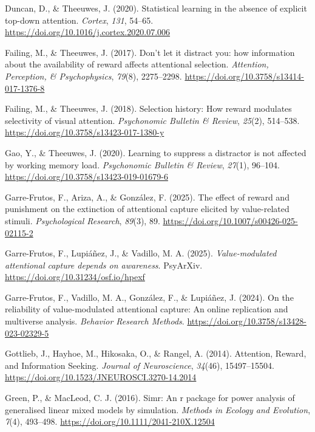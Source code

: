 \documentclass[
  man,
  floatsintext,
  longtable,
  nolmodern,
  notxfonts,
  notimes,
  colorlinks=true,linkcolor=blue,citecolor=blue,urlcolor=blue]{apa7}
\newlength{\cslhangindent}
\newenvironment{CSLReferences}[2] %
 {\begin{list}{}{%
  \setlength{\itemindent}{0pt}
  \setlength{\leftmargin}{0pt}
  \setlength{\parsep}{0pt}
  \ifodd #1
   \setlength{\leftmargin}{\cslhangindent}
   \setlength{\itemindent}{-1\cslhangindent}
  \fi
  \setlength{\itemsep}{#2\baselineskip}}}
 {\end{list}}
\begin{document}
\begin{CSLReferences}{1}{0}
Duncan, D., \& Theeuwes, J. (2020). Statistical learning in the absence
of explicit top-down attention. \emph{Cortex}, \emph{131}, 54--65.
\url{https://doi.org/10.1016/j.cortex.2020.07.006}

Failing, M., \& Theeuwes, J. (2017). Don{'}t let it distract you: how
information about the availability of reward affects attentional
selection. \emph{Attention, Perception, \& Psychophysics}, \emph{79}(8),
2275--2298. \url{https://doi.org/10.3758/s13414-017-1376-8}

Failing, M., \& Theeuwes, J. (2018). Selection history: How reward
modulates selectivity of visual attention. \emph{Psychonomic Bulletin \&
Review}, \emph{25}(2), 514--538.
\url{https://doi.org/10.3758/s13423-017-1380-y}

Gao, Y., \& Theeuwes, J. (2020). Learning to suppress a distractor is
not affected by working memory load. \emph{Psychonomic Bulletin \&
Review}, \emph{27}(1), 96--104.
\url{https://doi.org/10.3758/s13423-019-01679-6}

Garre-Frutos, F., Ariza, A., \& González, F. (2025). The effect of
reward and punishment on the extinction of attentional capture elicited
by value-related stimuli. \emph{Psychological Research}, \emph{89}(3),
89. \url{https://doi.org/10.1007/s00426-025-02115-2}

Garre-Frutos, F., Lupiáñez, J., \& Vadillo, M. A. (2025).
\emph{Value-modulated attentional capture depends on awareness}.
PsyArXiv. \url{https://doi.org/10.31234/osf.io/hpexf}

Garre-Frutos, F., Vadillo, M. A., González, F., \& Lupiáñez, J. (2024).
On the reliability of value-modulated attentional capture: An online
replication and multiverse analysis. \emph{Behavior Research Methods}.
\url{https://doi.org/10.3758/s13428-023-02329-5}

Gottlieb, J., Hayhoe, M., Hikosaka, O., \& Rangel, A. (2014). Attention,
Reward, and Information Seeking. \emph{Journal of Neuroscience},
\emph{34}(46), 15497--15504.
\url{https://doi.org/10.1523/JNEUROSCI.3270-14.2014}

Green, P., \& MacLeod, C. J. (2016). Simr: An r package for power
analysis of generalised linear mixed models by simulation. \emph{Methods
in Ecology and Evolution}, \emph{7}(4), 493--498.
\url{https://doi.org/10.1111/2041-210X.12504}


\end{CSLReferences}
\end{document}
